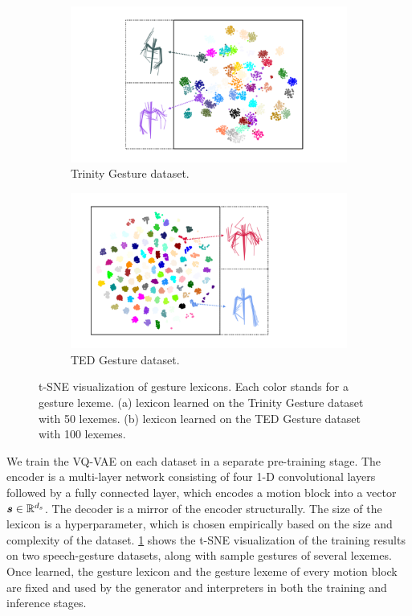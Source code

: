 \begin{figure}[t]
    \centering
    \begin{subfigure}[t]{0.47\linewidth}
        \centering
        \includegraphics[width=\linewidth]{figures/fig3a.pdf}
        \caption{Trinity Gesture dataset.}
    \end{subfigure}
    \hspace{\fill}
    \begin{subfigure}[t]{0.47\linewidth}
        \centering
        \includegraphics[width=\linewidth]{figures/fig3b.pdf}
        \caption{TED Gesture dataset.}
    \end{subfigure}
    \caption{t-SNE visualization of gesture lexicons. Each color stands for a gesture lexeme. (a) lexicon learned on the Trinity Gesture dataset with 50 lexemes. (b) lexicon learned on the TED Gesture dataset with 100 lexemes.}
    \Description{}
    \label{fig:gesture_lexicon}
\end{figure}

We train the VQ-VAE on each dataset in a separate pre-training stage. The encoder is a multi-layer network consisting of four 1-D convolutional layers followed by a fully connected layer, which encodes a motion block into a vector $\bm{s}\in\mathbb{R}^{d_s}$. The decoder is a mirror of the encoder structurally. The size of the lexicon is a hyperparameter, which is chosen empirically based on the size and complexity of the dataset. \fig\ref{fig:gesture_lexicon} shows the t-SNE visualization of the training results on two speech-gesture datasets, along with sample gestures of several lexemes. Once learned, the gesture lexicon and the gesture lexeme of every motion block are fixed and used by the generator and interpreters in both the training and inference stages.

